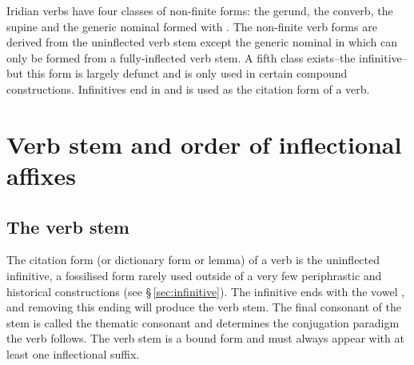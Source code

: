 \par Iridian verbs have four classes of non-finite forms: the gerund, the converb, the supine and the generic nominal formed with . The non-finite verb forms are derived from the uninflected verb stem except the generic nominal in  which can only be formed from a fully-inflected verb stem. A fifth class exists--the infinitive--but this form is largely defunct and is only used in certain compound constructions. Infinitives end in  and is used as the citation form of a verb.

\section{Verb stem and order of inflectional affixes}


\subsection{The verb stem}
\par The {\cscaps citation form} (or {\cscaps dictionary form} or {\cscaps lemma}) of a verb is the uninflected {\cscaps infinitive}, a fossilised form rarely used outside of a very few periphrastic and historical constructions (see \S\,\ref{sec:infinitive}). The infinitive ends with the vowel , and removing this ending will produce the {\cscaps verb stem}. The final consonant  of the stem is called the thematic consonant and determines the conjugation paradigm the verb follows. The verb stem is a bound form and must always appear with at least one inflectional suffix. 


